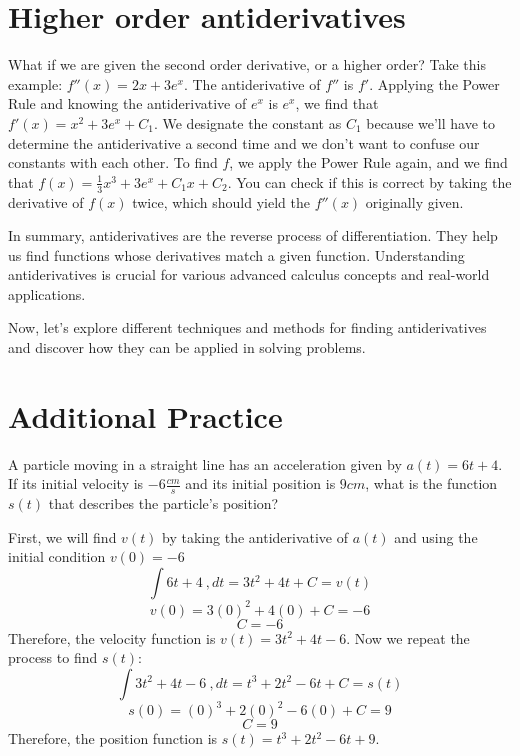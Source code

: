 \section{Higher order antiderivatives}
What if we are given the second order derivative, or a higher order? 
Take this example: $f''(x) = 2x+3e^x$. The antiderivative of $f''$ is 
$f'$. Applying the Power Rule and knowing the antiderivative of $e^x$ 
is $e^x$, we find that $f'(x) = x^2 + 3e^x + C_1$. We designate the 
constant as $C_1$ because we'll have to determine the antiderivative a 
second time and we don't want to confuse our constants with each other.
 To find $f$, we apply the Power Rule again, and we find that $f(x) = 
\frac{1}{3} x^3 + 3e^x + C_1x + C_2$. You can check if this is correct 
by taking the derivative of $f(x)$ twice, which should yield the 
$f''(x)$ originally given. 

In summary, antiderivatives are the reverse process of
differentiation. They help us find functions whose derivatives match a
given function. Understanding antiderivatives is crucial for various
advanced calculus concepts and real-world applications.

Now, let's explore different techniques and methods for finding
antiderivatives and discover how they can be applied in solving
problems.

\section{Additional Practice}

\begin{Exercise}[label=antideriv1]
	A particle moving in a straight line has an acceleration given by 
	$a(t) = 6t + 4$. If its initial velocity is $-6 \frac{cm}{s}$ and 
	its initial position is $9 cm$, what is the function $s(t)$ that 
	describes the particle's position?
\end{Exercise}

\begin{Answer}[ref=antideriv1]
	First, we will find $v(t)$ by taking the antiderivative of $a(t)$ and 
	using the initial condition $v(0) = -6$
	$$\int 6t + 4 \ , dt = 3t^2 + 4t + C = v(t)$$
	$$v(0) = 3(0)^2 + 4(0) + C = -6$$
	$$C = -6$$
	Therefore, the velocity function is $v(t) = 3t^2 + 4t - 6$. Now we 
	repeat the process to find $s(t)$:
	$$\int 3t^2 + 4t - 6 \ , dt = t^3 + 2t^2 - 6t + C = s(t)$$
	$$s(0) = (0)^3 + 2(0)^2 - 6(0) + C = 9$$
	$$C = 9$$
	Therefore, the position function is $s(t) = t^3 + 2t^2 - 6t + 9$. 
\end{Answer}

